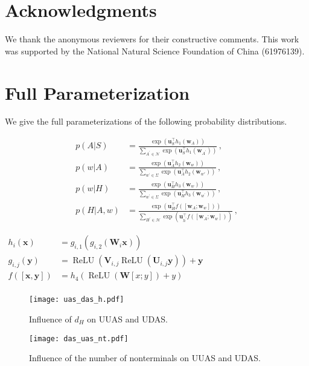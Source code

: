 \documentclass[11pt,a4paper]{article}
\newcommand{\mb}{\mathbf}
\begin{document}
\section*{Acknowledgments}
We thank the anonymous reviewers for their constructive comments. This work was supported by the National Natural Science Foundation of China (61976139).






\appendix
\section{Full Parameterization}
We give the full parameterizations of the following probability distributions.

\begin{align*}
p(  A|S) &= \frac{\exp (\mathbf{u}_{S}^{\top} h_1(\mb{w}_{A}))}{  \sum_{A^{\prime} \in \mathcal{N}} \exp (\mathbf{u}_{S}^{\top} h_1(\mb{w}_{A^{\prime}})) } \,,\\
p( w|A) &= \frac{\exp (\mathbf{u}_{A}^{\top} h_{2}( \mb{w}_{w}))}{  \sum_{w^{\prime} \in \Sigma} \exp (\mathbf{u}_{A}^{\top} h_{2}(\mb{w}_{w'}))}\,, \\
p(w |H) &= \frac{\exp (\mathbf{u}_{H}^{\top} h_3 ( \mb{w}_{w}) )}{  \sum_{w^{\prime} \in \Sigma} \exp (\mathbf{u}_{H}^{\top} h_3 ( \mb{w}_{w^{\prime}})) } \,, \\
p(H|A, w ) &=  \frac{ \exp (\mathbf{u}_{H}^{\top} f([\mathbf{w}_{A}; \mathbf{w}_{w}]) ) }{\sum_{H^{\prime} \in \mathcal{H}} \exp (\mathbf{u}_{h^{\prime}}^{\top} f([\mathbf{w}_{A}; \mathbf{w}_{w}])) } \,,
\end{align*}


$\begin{aligned} h_{i}(\mathbf{x}) &=g_{i, 1}\left(g_{i, 2}\left(\mathbf{W}_{i} \mathbf{x}\right)\right) \\ g_{i, j}(\mathbf{y}) &=\operatorname{ReLU}\left(\mathbf{V}_{i, j} \operatorname{ReLU}\left(\mathbf{U}_{i, j} \mathbf{y}\right)\right)+\mathbf{y}\\  f([\mathbf{x}, \mathbf{y}]) &=  h_{4}( \operatorname{ReLU}(\mathbf{W}[x;y]) + y)\\
\end{aligned}
$

\begin{figure}[tb!]
	\centering
	\texttt{[image: uas\_das\_h.pdf]}
	\caption{Influence of $d_H$ on  UUAS and UDAS. }
	\label{fig:das_h}
\end{figure}
\begin{figure}[tb!]
	\centering
	\texttt{[image: das\_uas\_nt.pdf]}
	\caption{Influence of the number of nonterminals on UUAS and UDAS.}
	\label{fig:das_nt}
\end{figure}
\end{document}
